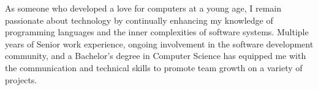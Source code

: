 

\begin{cvparagraph}

    As someone who developed a love for computers at a young age, I remain passionate about technology by
    continually enhancing my knowledge of programming languages and the inner complexities of software systems.
    Multiple years of Senior work experience, ongoing involvement in the software development community, and a
    Bachelor's degree in Computer Science has equipped me with the communication and technical skills to promote
    team growth on a variety of projects.
\end{cvparagraph}
